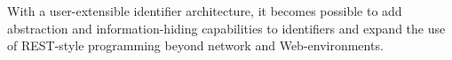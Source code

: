 \documentclass[preprint,authoryear]{acm_proc_article-sp}
\begin{document}
With a user-extensible identifier architecture, it becomes possible to add abstraction
and information-hiding capabilities to identifiers and expand the use of REST-style
programming beyond network and Web-environments.







\vfill
\break





\balancecolumns
\end{document}
